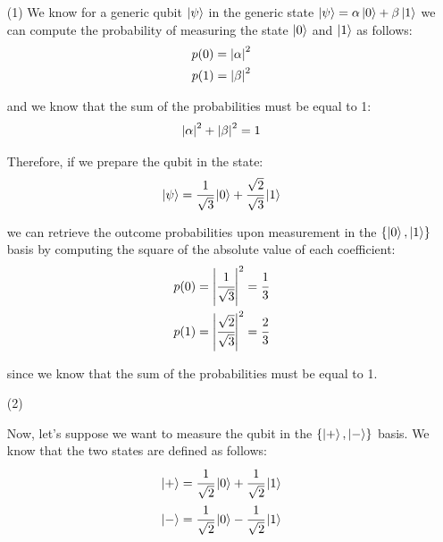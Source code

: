 \documentclass[12pt]{article}
\begin{document}
\begin{itemize}
    
\item[(1)]
We know for a generic qubit $\ket \psi$ in the generic state $\ket \psi = \alpha \ket 0 + \beta \ket 1$
we can compute the probability of measuring the state $\ket 0$ and $\ket 1$ as follows:
\begin{gather*}
    p(0) = \abs{\alpha}^2 \\
    p(1) = \abs{\beta}^2
\end{gather*}

and we know that the sum of the probabilities must be equal to 1:
\begin{gather*}
    \abs{\alpha}^2 + \abs{\beta}^2 = 1  
\end{gather*}

Therefore, if we prepare the qubit in the state:
\[ \ket \psi = \cfrac{1}{\sqrt{3}} \ket 0 + \cfrac{\sqrt{2}}{\sqrt{3}} \ket 1\]

we can retrieve the outcome probabilities upon measurement in the $\{\ket 0, \ket 1\}$ basis
by computing the square of the absolute value of each coefficient:
\begin{gather*}
    p(0) = \abs{\cfrac{1}{\sqrt{3}}}^2 = \cfrac{1}{3} \\
    p(1) = \abs{\cfrac{\sqrt{2}}{\sqrt{3}}}^2 = \cfrac{2}{3}
\end{gather*}

since we know that the sum of the probabilities must be equal to 1.

\item[(2)]

Now, let's suppose we want to measure the qubit in the $\{\ket +, \ket -\}$ basis. 
We know that the two states are defined as follows:
\begin{gather*}
    \ket + = \cfrac{1}{\sqrt{2}} \ket 0 + \cfrac{1}{\sqrt{2}} \ket 1 \\
    \ket - = \cfrac{1}{\sqrt{2}} \ket 0 - \cfrac{1}{\sqrt{2}} \ket 1
\end{gather*}


\end{itemize}
\end{document}
